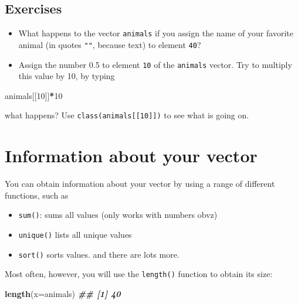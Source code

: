 \documentclass[
]{book}
\newenvironment{Shaded}{\begin{snugshade}}{\end{snugshade}}
\newcommand{\AttributeTok}[1]{\textcolor[rgb]{0.13,0.29,0.53}{#1}}
\newcommand{\DecValTok}[1]{\textcolor[rgb]{0.00,0.00,0.81}{#1}}
\newcommand{\DocumentationTok}[1]{\textcolor[rgb]{0.56,0.35,0.01}{\textbf{\textit{#1}}}}
\newcommand{\FunctionTok}[1]{\textcolor[rgb]{0.13,0.29,0.53}{\textbf{#1}}}
\newcommand{\NormalTok}[1]{#1}
\newcommand{\SpecialCharTok}[1]{\textcolor[rgb]{0.81,0.36,0.00}{\textbf{#1}}}
\providecommand{\tightlist}{%
  \setlength{\itemsep}{0pt}\setlength{\parskip}{0pt}}
\begin{document}
\subsection{Exercises}\label{exercises}

\begin{itemize}
\item
  What happens to the vector \texttt{animals} if you assign the name of your favorite animal (in quotes \texttt{""}, because text) to element \texttt{40}?
\item
  Assign the number 0.5 to element \texttt{10} of the \texttt{animals} vector. Try to multiply this value by 10, by typing
\end{itemize}

\begin{Shaded}
\begin{Highlighting}[]
\NormalTok{animals[[}\DecValTok{10}\NormalTok{]]}\SpecialCharTok{*}\DecValTok{10}
\end{Highlighting}
\end{Shaded}

what happens? Use \texttt{class(animals{[}{[}10{]}{]})} to see what is going on.

\section{Information about your vector}\label{information-about-your-vector}

You can obtain information about your vector by using a range of different functions, such as

\begin{itemize}
\tightlist
\item
  \texttt{sum()}: sums all values (only works with numbers obvz)\\
\item
  \texttt{unique()} lists all unique values\\
\item
  \texttt{sort()} sorts values.
  and there are lots more.
\end{itemize}

Most often, however, you will use the \texttt{length()} function to obtain its size:

\begin{Shaded}
\begin{Highlighting}[]
\FunctionTok{length}\NormalTok{(}\AttributeTok{x=}\NormalTok{animals)}
\DocumentationTok{\#\# [1] 40}
\end{Highlighting}
\end{Shaded}
\end{document}
